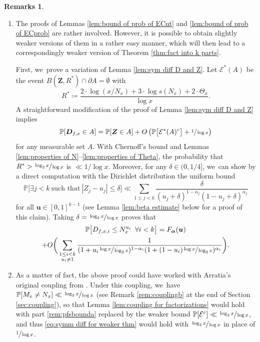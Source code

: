 \documentclass[10pt,a4paper]{amsart}
\providecommand{\skpt}{\smallskip}
\newenvironment{enumeratea}
{\bgroup\def\theenumi{\alph{enumi}}\begin{enumerate}}
{\end{enumerate}\egroup}
\newcommand{\bu}{{\boldsymbol u}}
\newcommand{\bD}{{\boldsymbol D}}
\newcommand{\bZ}{{\boldsymbol Z}}
\newcommand{\PP}{\mathbb{P}}
\newcommand{\boldalpha}{\boldsymbol{\alpha}}
\newcommand{\EC}{\mathcal{E}}
\newcommand{\bg}{\big}
\newcommand{\bgg}{\Big}
\newcommand{\bggg}{\bigg}
\theoremstyle{plain}
\theoremstyle{definition}
\newtheorem*{remss}{Remarks}
\providecommand{\skpt}{\par\smallskip}
\begin{document}
\skpt
\begin{remss}
\begin{enumeratea}
\item\label{rem:pfsbounda}
The proofs of Lemmas \ref{lem:bound of prob of ECnt} and \ref{lem:bound of prob of ECprob} are rather involved. However, it is possible to obtain slightly weaker versions of them in a rather easy manner, which will then lead to a correspondingly weaker version of Theorem \ref{thm:fact into k parts}.

First, we~prove a variation of Lemma \ref{lem:sym diff D and Z}. Let $\EC^*(A)$ be the event $B(\bZ,R^*)\cap \partial A=\emptyset$ with
\[
R^* \coloneqq \frac{2\cdot \log(x/N_x) + 3\cdot \log s(N_x) + 2\cdot \Theta_x}{\log x}.
\]
A straightforward modification of the proof of Lemma \ref{lem:sym diff D and Z} implies
\begin{equation}
\label{eq:symm diff for weaker thm}
\PP[\bD_{f, x} \in A] = \PP[\bZ \in A] + O\left(\PP\bg[\EC^*(A)^c\bg] + \sfrac{1}{\log x}\right)
\end{equation}
for any measurable set $A$. With Chernoff's bound and Lemmas \ref{lem:properties of N}--\ref{lem:properties of Theta}, the probability that $R^*>\sfrac{\log_2 x}{\log x}$ is $\ll 1/\log x$. Moreover, for any $\delta\in(0,1/4]$, we~can show by a direct computation with the Dirichlet distribution the uniform bound
\[
\PP\bgg[\exists j < k\ \text{such that}\ |Z_j-u_j|\le \delta \bgg] \ll \sum_{1\le j<k} \frac{\delta}{(u_j+\delta)^{1-\alpha_j}(1-u_j+\delta)^{\alpha_j}}
\]
for all $\bu\in [0,1]^{k-1}$ (see Lemma \ref{lem:beta estimate} below for a proof of this claim). Taking \hbox{$\delta=\sfrac{\log_2x}{\log x}$} proves that
\begin{multline*}
\PP\bg[D_{f,x,i} \le N_x^{u_i}\ \, \forall i < k\bg] = F_{\boldalpha}(\bu) \\
+ O\bggg(\sum_{\substack{1 \le i < k \\ u_i \ne 1}} \frac{1}{(1+u_i\sfrac{\log x}{\log_2x})^{1-\alpha_i}(1+(1-u_i)\sfrac{\log x}{\log_2x})^{\alpha_i}}\bggg).
\end{multline*}

\item\label{rem:pfsboundb}
As a matter of fact, the above proof could have worked with Arratia's original coupling from \cite{Arratia02}. Under this coupling, we~have $\PP[M_x \ne N_x] \ll \sfrac{\log_2x}{\log x}$ (see Remark \eqref{rem:couplingb} at the end of Section \ref{sec:coupling}), so that Lemma \ref{lem:coupling for factorizations} would hold with part \eqref{rem:pfsbounda} replaced by the weaker bound $\PP[\EC^c]\ll \sfrac{\log_2x}{\log x}$, and thus \eqref{eq:symm diff for weaker thm} would hold with $\sfrac{\log_2x}{\log x}$ in place of $\sfrac{1}{\log x}$.
\end{enumeratea}
\end{remss}
\end{document}
